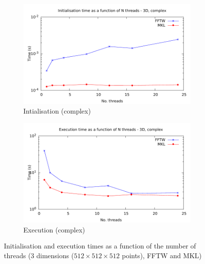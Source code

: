 \documentclass[12pt, a4paper]{article}
\begin{document}
\begin{figure}[H]
\begin{subfigure}{.5\textwidth}
\centering
\includegraphics[width=.9\linewidth]{graphs/3d-multh-init-c.pdf}
\caption{Intialisation (complex)}
\label{3DMULTHCI}
\end{subfigure}%
\begin{subfigure}{.5\textwidth}
\centering
\includegraphics[width=.9\linewidth]{graphs/3d-multh-exec-c.pdf}
\caption{Execution (complex)}
\label{3DMULTHCR}
\end{subfigure}
\caption{Initialisation and execution times as a function of the number of threads (3 dimensions ($512 \times 512\times 512$ points), FFTW and MKL)}
\label{3DMKL}
\end{figure}
\end{document}
